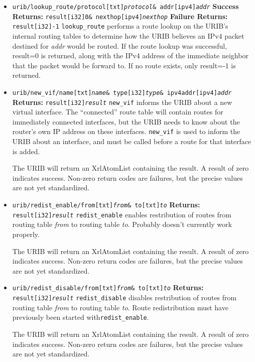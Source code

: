 \documentclass[11pt]{article}
\begin{document}
\begin{itemize}
\item 
{\tt urib/lookup\_route/protocol[txt]{\it protocol}\& addr[ipv4]{\it addr}}
\newline
{\bf Success Returns:} {\tt result[i32]0\& nexthop[ipv4]{\it nexthop}}
\newline
{\bf Failure Returns:} {\tt result[i32]-1}
\newline
{\tt lookup\_route} performs a route lookup on the URIB's internal
routing tables to determine how the URIB believes an IPv4 packet
destined for {\it addr} would be routed.  If the route lookup was
successful, result=0 is returned, along with the IPv4 address of the
immediate neighbor that the packet would be forward to.  If no route
exists, only result=-1 is returned.

\item 
{\tt urib/new\_vif/name[txt]{\it name}\& type[i32]{\it type}\& ipv4addr[ipv4]{\it addr}}
\newline
{\bf Returns:} {\tt result[i32]{\it result}}
\newline
{\tt new\_vif} informs the URIB about a new virtual interface.  The
``connected'' route table will contain routes for immediately
connected interfaces, but the URIB needs to know about the router's
own IP address on these interfaces.  {\tt new\_vif} is used to inform
the URIB about an interface, and must be called before a route for
that interface is added.

The URIB will return an XrlAtomList containing the result.  A result
of zero indicates success.  Non-zero return codes are failures, but
the precise values are not yet standardized.

\item 
{\tt urib/redist\_enable/from[txt]{\it from}\& to[txt]{\it to}}
\newline
{\bf Returns:} {\tt result[i32]{\it result}}
\newline
{\tt redist\_enable} enables restribution of routes from routing table
{\it from} to routing table {\it to}.  Probably doesn't currently work
properly.

The URIB will return an XrlAtomList containing the result.  A result
of zero indicates success.  Non-zero return codes are failures, but
the precise values are not yet standardized.
\item 
{\tt urib/redist\_disable/from[txt]{\it from}\& to[txt]{\it to}}
\newline
{\bf Returns:} {\tt result[i32]{\it result}}
\newline
{\tt redist\_disable} disables restribution of routes from routing
table {\it from} to routing table {\it to}.  Route redistribution must
have previously been started with{\tt redist\_enable}.

The URIB will return an XrlAtomList containing the result.  A result
of zero indicates success.  Non-zero return codes are failures, but
the precise values are not yet standardized.
\end{itemize}
\end{document}
